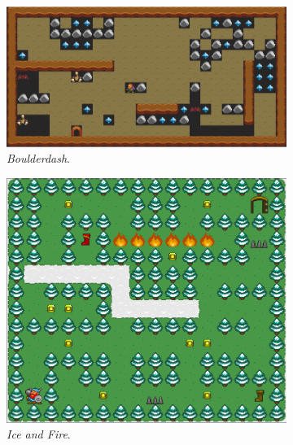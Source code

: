 \begin{figure}[H]
    \centering
    \begin{subfigure}[t]{.5\textwidth}
        \centering
        \includegraphics[scale=0.3]{img/CH08/boulderdash.png}
        \caption{\textit{Boulderdash}.}
        \label{fig:boulderdash}
    \end{subfigure}%
    \begin{subfigure}[t]{.5\textwidth}
        \centering
        \includegraphics[scale=0.25]{img/CH08/ice_and_fire.png}
        \caption{\textit{Ice and Fire}.}
        \label{fig:ice_and_fire}
    \end{subfigure}
    \par\bigskip
    \begin{subfigure}[t]{0.5\textwidth}
        \centering

\end{subfigure}
\end{figure}
